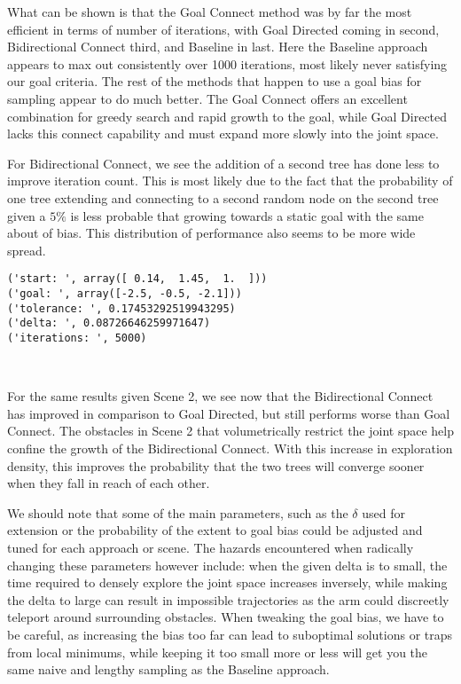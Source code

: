 \documentclass{article}
\begin{document}
What can be shown is that the Goal Connect method was by far the most
efficient in terms of number of iterations, with Goal Directed coming in
second, Bidirectional Connect third, and Baseline in last. Here the
Baseline approach appears to max out consistently over 1000 iterations,
most likely never satisfying our goal criteria. The rest of the methods
that happen to use a goal bias for sampling appear to do much better.
The Goal Connect offers an excellent combination for greedy search and
rapid growth to the goal, while Goal Directed lacks this connect
capability and must expand more slowly into the joint space.

For Bidirectional Connect, we see the addition of a second tree has done
less to improve iteration count. This is most likely due to the fact
that the probability of one tree extending and connecting to a second
random node on the second tree given a $5\%$ is less probable that
growing towards a static goal with the same about of bias. This
distribution of performance also seems to be more wide spread.


    \begin{Verbatim}[commandchars=\\\{\}]
('start: ', array([ 0.14,  1.45,  1.  ]))
('goal: ', array([-2.5, -0.5, -2.1]))
('tolerance: ', 0.17453292519943295)
('delta: ', 0.08726646259971647)
('iterations: ', 5000)
    \end{Verbatim}



    \begin{center}
    \end{center}
    { \hspace*{\fill} \\}
    
    For the same results given Scene 2, we see now that the Bidirectional
Connect has improved in comparison to Goal Directed, but still performs
worse than Goal Connect. The obstacles in Scene 2 that volumetrically
restrict the joint space help confine the growth of the Bidirectional
Connect. With this increase in exploration density, this improves the
probability that the two trees will converge sooner when they fall in
reach of each other.

We should note that some of the main parameters, such as the $\delta$
used for extension or the probability of the extent to goal bias could
be adjusted and tuned for each approach or scene. The hazards
encountered when radically changing these parameters however include:
when the given delta is to small, the time required to densely explore
the joint space increases inversely, while making the delta to large can
result in impossible trajectories as the arm could discreetly teleport
around surrounding obstacles. When tweaking the goal bias, we have to be
careful, as increasing the bias too far can lead to suboptimal solutions
or traps from local minimums, while keeping it too small more or less
will get you the same naive and lengthy sampling as the Baseline
approach.
\end{document}

